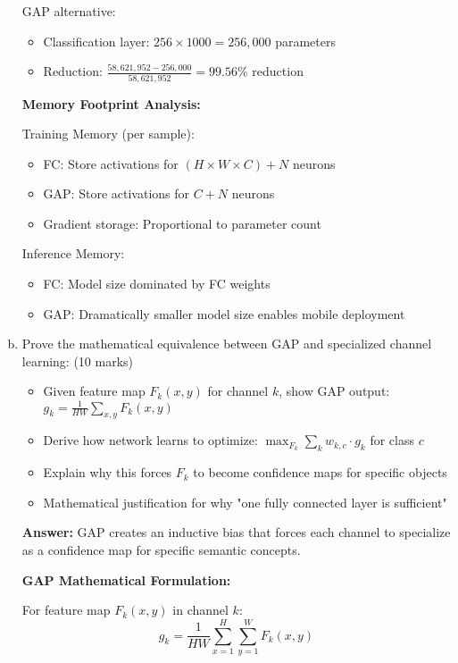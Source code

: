 \documentclass[12pt]{article}
\newcommand{\answer}[1]{{\color{answercolor}\textbf{Answer:} #1}}
\newcommand{\explanation}[1]{{\color{explanationcolor}#1}}
\begin{document}
\begin{enumerate}[(a)]
{    GAP alternative:
    \begin{itemize}
        \item Classification layer: $256 \times 1000 = 256,000$ parameters
        \item Reduction: $\frac{58,621,952 - 256,000}{58,621,952} = 99.56\%$ reduction
    \end{itemize}
    
    \textbf{Memory Footprint Analysis:}
    
    Training Memory (per sample):
    \begin{itemize}
        \item FC: Store activations for $(H \times W \times C) + N$ neurons
        \item GAP: Store activations for $C + N$ neurons
        \item Gradient storage: Proportional to parameter count
    \end{itemize}
    
    Inference Memory:
    \begin{itemize}
        \item FC: Model size dominated by FC weights
        \item GAP: Dramatically smaller model size enables mobile deployment
    \end{itemize}
    }
    
    \item Prove the mathematical equivalence between GAP and specialized channel learning: \hfill (10 marks)
    \begin{itemize}
        \item Given feature map $F_k(x,y)$ for channel $k$, show GAP output: $g_k = \frac{1}{HW}\sum_{x,y} F_k(x,y)$
        \item Derive how network learns to optimize: $\max_{F_k} \sum_k w_{k,c} \cdot g_k$ for class $c$
        \item Explain why this forces $F_k$ to become confidence maps for specific objects
        \item Mathematical justification for why "one fully connected layer is sufficient"
    \end{itemize}
    
    \answer{GAP creates an inductive bias that forces each channel to specialize as a confidence map for specific semantic concepts.}
    
    \explanation{
    \textbf{GAP Mathematical Formulation:}
    
    For feature map $F_k(x,y)$ in channel $k$:
    $$g_k = \frac{1}{HW}\sum_{x=1}^H \sum_{y=1}^W F_k(x,y)$$
    
}
\end{enumerate}
\end{document}
